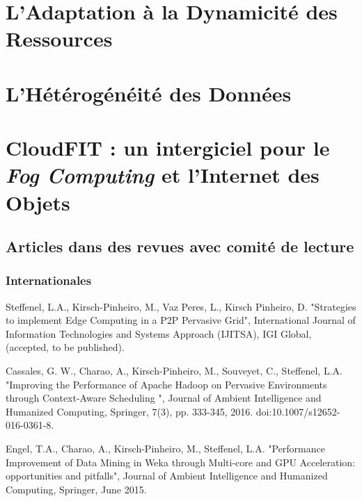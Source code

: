 \documentclass[final,twoside]{hdr} %
\begin{document}


\chapter{L'Adaptation à la Dynamicité des Ressources}



\chapter{L'Hétérogénéité des Données}




\chapter{CloudFIT : un intergiciel pour le \textit{Fog Computing} et l'Internet des Objets\label{chap:CloudFIT}}








\section*{Articles dans des revues avec comité de lecture}

\subsection*{Internationales}

Steffenel, L.A., Kirsch-Pinheiro, M., Vaz Peres, L., Kirsch Pinheiro, D. "Strategies to implement Edge Computing in a P2P Pervasive Grid", International Journal of Information Technologies and Systems Approach (IJITSA), IGI Global, (accepted, to be published). 

Cassales, G. W., Charao, A., Kirsch-Pinheiro, M., Souveyet, C., Steffenel, L.A. "Improving the Performance of Apache Hadoop on Pervasive Environments through Context-Aware Scheduling ", Journal of Ambient Intelligence and Humanized Computing, Springer, 7(3), pp. 333-345, 2016. doi:10.1007/s12652-016-0361-8. 

Engel, T.A., Charao, A., Kirsch-Pinheiro, M., Steffenel, L.A. "Performance Improvement of Data Mining in Weka through Multi-core and GPU Acceleration: opportunities and pitfalls", Journal of Ambient Intelligence and Humanized Computing, Springer, June 2015. 
\end{document}
